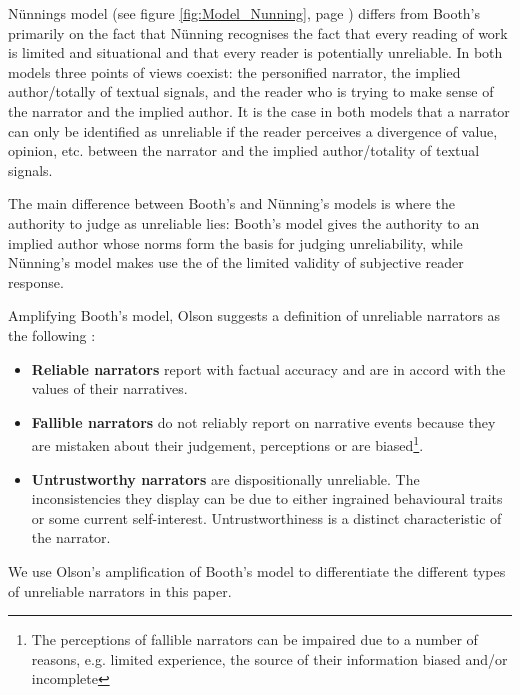 
N\"unnings model (see figure \ref{fig:Model_Nunning}, page \pageref{fig:Model_Nunning}) differs from Booth's primarily on the fact that N\"unning recognises the fact that every reading of work is limited and situational and that every reader is potentially unreliable\cite[98]{Olson}. In both models three points of views coexist: the personified narrator, the implied author/totally of textual signals, and the reader who is trying to make sense of the narrator and the implied author. It is the case in both models that a narrator can only be identified as unreliable if the reader perceives a divergence of value, opinion, etc. between the narrator and the implied author/totality of textual signals.

The main difference between Booth's and N\"unning's models is where the authority to judge as unreliable lies: Booth's model gives the authority to an implied author whose norms form the basis for judging unreliability, while N\"unning's model makes use the of the limited validity of subjective reader response.

Amplifying Booth's model, Olson suggests a definition of unreliable narrators as the following \cite[101-102]{Olson}:
\begin{itemize}
	\item \textbf{Reliable narrators} report with factual accuracy and are in accord with the values of their narratives.
	\item \textbf{Fallible narrators} do not reliably report on narrative events because they are mistaken about their judgement, perceptions or are biased\footnote{The perceptions of fallible narrators can be impaired due to a number of reasons, e.g. limited experience, the source of their information biased and/or incomplete}.
	\item \textbf{Untrustworthy narrators} are dispositionally unreliable. The inconsistencies they display can be due to either ingrained behavioural traits or some current self-interest. Untrustworthiness is a distinct characteristic of the narrator.
\end{itemize}

We use Olson's amplification of Booth's model to differentiate the different types of unreliable narrators in this paper.